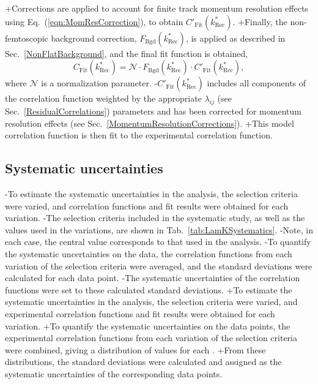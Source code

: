 \begin{table}[htbp]
+Corrections are applied to account for finite track momentum resolution effects using Eq.~(\ref{eqn:MomResCorrection}), to obtain $C'_{\mathrm{Fit}}(k^{*}_{\mathrm{Rec}})$.
+Finally, the non-femtoscopic background correction, $F_{\mathrm{Bgd}}(k^{*}_{\mathrm{Rec}})$, is applied as described in Sec.~\ref{NonFlatBackground}, and the final fit function is obtained,
 \begin{equation}
 C_{\mathrm{Fit}}(k^{*}_{\mathrm{Rec}}) = \mathcal{N}\cdot F_{\mathrm{Bgd}}(k^{*}_{\mathrm{Rec}})\cdot C'_{\mathrm{Fit}}(k^{*}_{\mathrm{Rec}}),
 \end{equation}
 where $\mathcal{N}$ is a normalization parameter.
-$C'_{\mathrm{Fit}}(k^{*}_{\mathrm{Rec}})$ includes all components of the correlation function weighted by the appropriate $\lambda_{ij}$ (see Sec.~\ref{ResidualCorrelations}) parameters and has been corrected for momentum resolution effects (see Sec.~\ref{MomentumResolutionCorrections}).
+This model correlation function is then fit to the experimental correlation function.
 
 \subsection{Systematic uncertainties}
 \label{SysErrs}
 
-To estimate the systematic uncertainties in the analysis, the selection criteria were varied, and correlation functions and fit results were obtained for each variation.
-The selection criteria included in the systematic study, as well as the values used in the variations, are shown in Tab.~\ref{tab:LamKSystematics}.  
-Note, in each case, the central value corresponds to that used in the analysis.
-To quantify the systematic uncertainties on the data, the correlation functions from each variation of the selection criteria were averaged, and the standard deviations were calculated for each data point.
-The systematic uncertainties of the correlation functions were set to these calculated standard deviations.
+To estimate the systematic uncertainties in the analysis, the selection criteria were varied, and experimental correlation functions and fit results were obtained for each variation.
+To quantify the systematic uncertainties on the data points, the experimental correlation functions from each variation of the selection criteria were combined, giving a distribution of values for each \kstar.
+From these distributions, the standard deviations were calculated and assigned as the systematic uncertainties of the corresponding data points.
 

\end{table}
